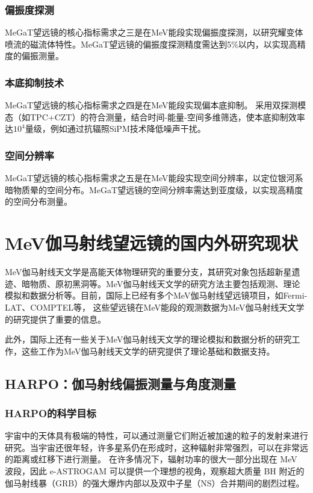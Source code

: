 \subsubsection{偏振度探测}
	MeGaT望远镜的核心指标需求之三是在MeV能段实现偏振度探测，以研究耀变体喷流的磁流体特性。MeGaT望远镜的偏振度探测精度需达到5\%以内，以实现高精度的偏振测量。
\subsubsection{本底抑制技术}
	MeGaT望远镜的核心指标需求之四是在MeV能段实现偏本底抑制。
	采用双探测模态（如TPC+CZT）的符合测量，结合时间-能量-空间多维筛选，使本底抑制效率达$10^{4}$量级，例如通过抗辐照SiPM技术降低噪声干扰。
\subsubsection{空间分辨率}
	MeGaT望远镜的核心指标需求之五是在MeV能段实现空间分辨率，以定位银河系暗物质晕的空间分布。MeGaT望远镜的空间分辨率需达到亚度级，以实现高精度的空间分布测量。
	
\section{MeV伽马射线望远镜的国内外研究现状}
\label{sec:status}
MeV伽马射线天文学是高能天体物理研究的重要分支，其研究对象包括超新星遗迹、暗物质、原初黑洞等。MeV伽马射线天文学的研究方法主要包括观测、理论模拟和数据分析等。目前，国际上已经有多个MeV伽马射线望远镜项目，如Fermi-LAT、COMPTEL等，
这些望远镜在MeV能段的观测数据为MeV伽马射线天文学的研究提供了重要的信息。\par
此外，国际上还有一些关于MeV伽马射线天文学的理论模拟和数据分析的研究工作，这些工作为MeV伽马射线天文学的研究提供了理论基础和数据支持。\par
\subsection{HARPO：伽马射线偏振测量与角度测量}
\subsubsection{HARPO的科学目标}
	宇宙中的天体具有极端的特性，可以通过测量它们附近被加速的粒子的发射来进行研究。当宇宙还很年轻，许多星系仍在形成时，这种辐射非常强烈，可以在非常远的距离或红移下进行测量。
	在许多情况下，辐射功率的很大一部分出现在 MeV 波段，因此 e-ASTROGAM 可以提供一个理想的视角，观察超大质量 BH 附近的伽马射线暴（GRB）的强大爆炸内部以及双中子星（NS）合并期间的剧烈过程。
